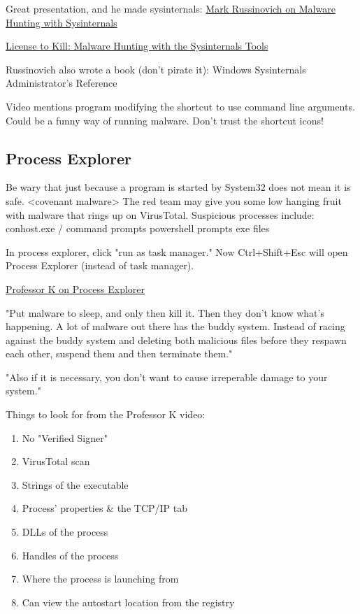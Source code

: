 \documentclass{article}
\begin{document}
Great presentation, and he made sysinternals: 
\href{https://youtu.be/vW8eAqZyWeo}{Mark Russinovich on Malware Hunting with Sysinternals}

\href{https://youtu.be/A_TPZxuTzBU}{License to Kill: Malware Hunting with the Sysinternals Tools }

Russinovich also wrote a book (don't pirate it): Windows Sysinternals Administrator’s Reference

Video mentions program modifying the shortcut to use command line arguments. 
Could be a funny way of running malware. Don't trust the shortcut icons!

\subsection{Process Explorer}
Be wary that just because a program is started by System32 does not mean it is safe. <covenant malware>
The red team may give you some low hanging fruit with malware that rings up on VirusTotal.
Suspicious processes include:
conhost.exe / command prompts
powershell prompts
exe files

In process explorer, click "run as task manager." Now Ctrl+Shift+Esc will open Process Explorer (instead of task manager).

\href{https://youtu.be/y2bNLCWHFNs}{Professor K on Process Explorer}

"Put malware to sleep, and only then kill it. 
Then they don't know what's happening.
A lot of malware out there has
the buddy system. Instead of racing against the buddy system
and deleting both malicious files before they respawn each other,
suspend them and then terminate them."

"Also if it is necessary, you don't want to cause irreperable damage to your system."

Things to look for from the Professor K video:
\begin{enumerate}
        \item No "Verified Signer"
        \item VirusTotal scan
        \item Strings of the executable
        \item Process' properties \& the TCP/IP tab
        \item DLLs of the process
        \item Handles of the process
        \item Where the process is launching from
        \item Can view the autostart location from the registry
\end{enumerate}
\end{document}
